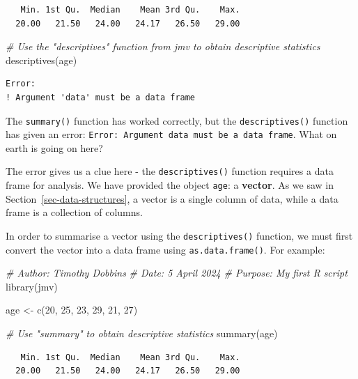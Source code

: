 \documentclass[
  a4paper,
]{memoir}
\newenvironment{Shaded}{\begin{snugshade}}{\end{snugshade}}
\newcommand{\CommentTok}[1]{\textcolor[rgb]{0.00,0.00,0.00}{\textit{#1}}}
\newcommand{\DecValTok}[1]{\textcolor[rgb]{0.00,0.00,0.00}{#1}}
\newcommand{\FunctionTok}[1]{\textcolor[rgb]{0.00,0.00,0.00}{#1}}
\newcommand{\NormalTok}[1]{\textcolor[rgb]{0.00,0.00,0.00}{#1}}
\newcommand{\OtherTok}[1]{\textcolor[rgb]{0.00,0.00,0.00}{#1}}
\begin{document}
\begin{verbatim}
   Min. 1st Qu.  Median    Mean 3rd Qu.    Max. 
  20.00   21.50   24.00   24.17   26.50   29.00 
\end{verbatim}

\begin{Shaded}
\begin{Highlighting}[]
\CommentTok{\# Use the "descriptives" function from jmv to obtain descriptive statistics}
\FunctionTok{descriptives}\NormalTok{(age)}
\end{Highlighting}
\end{Shaded}

\begin{verbatim}
Error:
! Argument 'data' must be a data frame
\end{verbatim}

The \texttt{summary()} function has worked correctly, but the
\texttt{descriptives()} function has given an error:
\texttt{Error:\ Argument\ \textquotesingle{}data\textquotesingle{}\ must\ be\ a\ data\ frame}.
What on earth is going on here?

The error gives us a clue here - the \texttt{descriptives()} function
requires a data frame for analysis. We have provided the object
\texttt{age}: a \textbf{vector}. As we saw in
Section~\ref{sec-data-structures}, a vector is a single column of data,
while a data frame is a collection of columns.

In order to summarise a vector using the \texttt{descriptives()}
function, we must first convert the vector into a data frame using
\texttt{as.data.frame()}. For example:

\begin{Shaded}
\begin{Highlighting}[]
\CommentTok{\# Author: Timothy Dobbins}
\CommentTok{\# Date: 5 April 2024}
\CommentTok{\# Purpose: My first R script}
\FunctionTok{library}\NormalTok{(jmv)}

\NormalTok{age }\OtherTok{\textless{}{-}} \FunctionTok{c}\NormalTok{(}\DecValTok{20}\NormalTok{, }\DecValTok{25}\NormalTok{, }\DecValTok{23}\NormalTok{, }\DecValTok{29}\NormalTok{, }\DecValTok{21}\NormalTok{, }\DecValTok{27}\NormalTok{)}

\CommentTok{\# Use "summary" to obtain descriptive statistics}
\FunctionTok{summary}\NormalTok{(age)}
\end{Highlighting}
\end{Shaded}

\begin{verbatim}
   Min. 1st Qu.  Median    Mean 3rd Qu.    Max. 
  20.00   21.50   24.00   24.17   26.50   29.00 
\end{verbatim}
\end{document}
